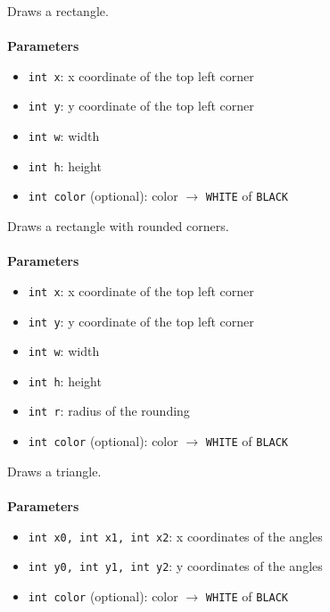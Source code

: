 \documentclass[11pt,fleqn]{book} %
\begin{document}
\begin{libf}[drawRect(x, y, w, h, \emph{color=WHITE})]
	Draws a rectangle.\\ \\
	\textbf{Parameters}
	\begin{itemize}
		\item \texttt{int x}: x coordinate of the top left corner
		\item \texttt{int y}: y coordinate of the top left corner
		\item \texttt{int w}: width
		\item \texttt{int h}: height
		\item \texttt{int color} (optional): color $\rightarrow$ \texttt{WHITE} of \texttt{BLACK}
	\end{itemize}
\end{libf}

\begin{libf}[drawRoundRect(x, y, w, h, r, \emph{color=WHITE})]
	Draws a rectangle with rounded corners.\\ \\
	\textbf{Parameters}
	\begin{itemize}
		\item \texttt{int x}: x coordinate of the top left corner
		\item \texttt{int y}: y coordinate of the top left corner
		\item \texttt{int w}: width
		\item \texttt{int h}: height
		\item \texttt{int r}: radius of the rounding
		\item \texttt{int color} (optional): color $\rightarrow$ \texttt{WHITE} of \texttt{BLACK}
	\end{itemize}
\end{libf}

\begin{libf}[drawTriangle(x0, y0, x1, y1, x2, y2, \emph{color=WHITE})]
	Draws a triangle.\\ \\
	\textbf{Parameters}
	\begin{itemize}
		\item \texttt{int x0, int x1, int x2}: x coordinates of the angles
		\item \texttt{int y0, int y1, int y2}: y coordinates of the angles
		\item \texttt{int color} (optional): color $\rightarrow$ \texttt{WHITE} of \texttt{BLACK}
	\end{itemize}
\end{libf}
\end{document}
